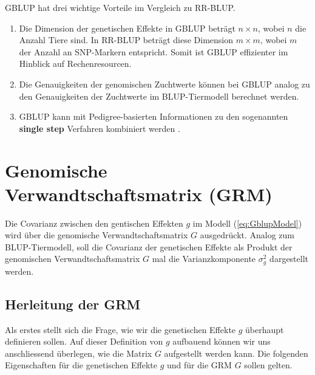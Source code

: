 \documentclass[]{book}
\providecommand{\tightlist}{%
  \setlength{\itemsep}{0pt}\setlength{\parskip}{0pt}}
\begin{document}
GBLUP hat drei wichtige Vorteile im Vergleich zu RR-BLUP.

\begin{enumerate}
\def\labelenumi{\arabic{enumi}.}
\tightlist
\item
  Die Dimension der genetischen Effekte in GBLUP beträgt \(n\times n\),
  wobei \(n\) die Anzahl Tiere sind. In RR-BLUP beträgt diese Dimension
  \(m\times m\), wobei \(m\) der Anzahl an SNP-Markern entspricht. Somit
  ist GBLUP effizienter im Hinblick auf Rechenresourcen.
\item
  Die Genauigkeiten der genomischen Zuchtwerte können bei GBLUP analog
  zu den Genauigkeiten der Zuchtwerte im BLUP-Tiermodell berechnet
  werden.
\item
  GBLUP kann mit Pedigree-basierten Informationen zu den sogenannten
  \textbf{single step} Verfahren kombiniert werden \citep{MLA2009}.
\end{enumerate}

\section{Genomische Verwandtschaftsmatrix
(GRM)}\label{genomische-verwandtschaftsmatrix-grm}

Die Covarianz zwischen den gentischen Effekten \(g\) im Modell
(\ref{eq:GblupModel}) wird über die genomische Verwandtschaftsmatrix
\(G\) ausgedrückt. Analog zum BLUP-Tiermodell, soll die Covarianz der
genetischen Effekte als Produkt der genomischen Verwandtschaftsmatrix
\(G\) mal die Varianzkomponente \(\sigma_g^2\) dargestellt werden.

\subsection{Herleitung der GRM}\label{herleitung-der-grm}

Als erstes stellt sich die Frage, wie wir die genetischen Effekte \(g\)
überhaupt definieren sollen. Auf dieser Definition von \(g\) aufbauend
können wir uns anschliessend überlegen, wie die Matrix \(G\) aufgestellt
werden kann. Die folgenden Eigenschaften für die genetischen Effekte
\(g\) und für die GRM \(G\) sollen gelten.
\end{document}
